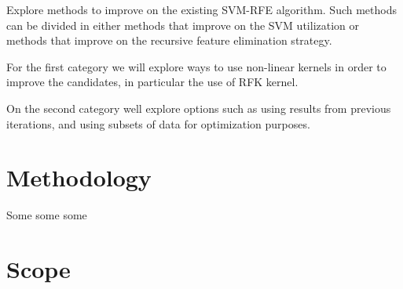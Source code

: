 Explore methods to improve on the existing SVM-RFE algorithm. Such methods can be divided in either methods that improve on the SVM utilization or methods that improve on the recursive feature elimination strategy.

For the first category we will explore ways to use non-linear kernels in order to improve the candidates, in particular the use of RFK kernel.

On the second category well explore options such as using results from previous iterations, and using subsets of data for optimization purposes.


\section{Methodology}

Some some some


\section{Scope}
